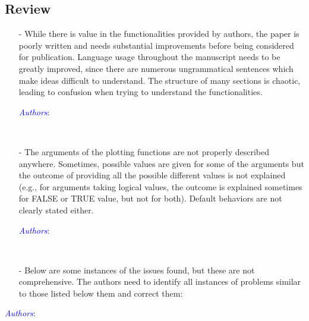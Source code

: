 \documentclass[11pt]{article}
\newcommand{\authors}[1]{

 \parbox{15cm}{\textcolor{blue}{\it Authors}: \color{red}#1}
 \\ \vspace{0.3cm}
}
\begin{document}
\subsection*{Review}
\begin{itemize}
\item[-]
While there is value in the functionalities provided by authors, the paper is poorly written and needs substantial improvements before being considered for publication. Language usage throughout the manuscript needs to be greatly improved, since there are numerous ungrammatical sentences which make ideas difficult to understand. The structure of many sections is chaotic, leading to confusion when trying to understand the functionalities.
\authors{

}


\item[-]
The arguments of the plotting functions are not properly described anywhere. Sometimes, possible values are given for some of the arguments but the outcome of providing all the possible different values is not explained (e.g., for arguments taking logical values, the outcome is explained sometimes for FALSE or TRUE value, but not for both). Default behaviors are not clearly stated either. 
\authors{

}


\item[-]
Below are some instances of the issues found, but these are not comprehensive. The authors need to identify all instances of problems similar to those listed below them and correct them:
\end{itemize}
\authors{

}
\end{document}
